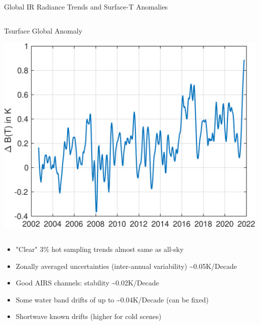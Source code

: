 \documentclass[10pt,t]{beamer}
\begin{document}
\begin{frame}{Global IR Radiance Trends and Surface-T Anomalies}
\begin{columns}
\begin{column}{0.5\columnwidth}
\begin{block}{\footnotesize Tsurface Global Anomaly}
\vspace{-0.05in}
\begin{center}
\includegraphics[width=\linewidth]{SunClimate2022/global_bt1231_anomaly.pdf}
\end{center}
\end{block}
\end{column}
\end{columns}

\vspace{-0.1in}
\small
\begin{itemize}
\item "Clear" 3\% hot sampling trends almost same as all-sky
\item Zonally averaged uncertainties (inter-annual variability) \textasciitilde{}0.05K/Decade
\item Good AIRS channels: stability \textasciitilde{}0.02K/Decade
\item Some water band drifts of up to \textasciitilde{}0.04K/Decade (can be fixed)
\item Shortwave known drifts (higher for cold scenes)
\end{itemize}
\end{frame}
\end{document}
